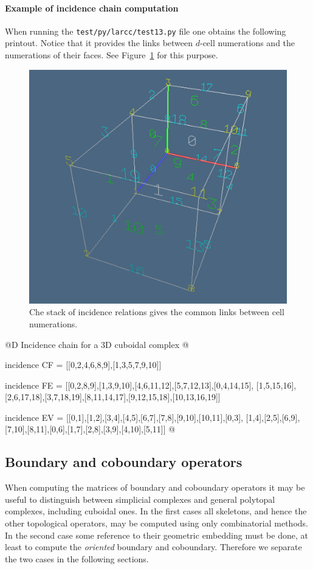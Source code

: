 \documentclass[11pt,oneside]{article}	%
\begin{document}
\paragraph{Example of incidence chain computation}
When running the \texttt{test/py/larcc/test13.py} file one obtains the following printout. 
Notice that 
it provides the links between $d$-cell numerations and the numerations of their faces.
See Figure~\ref{incidenceChain} for this purpose.

\begin{figure}[htbp] %
   \centering
   \includegraphics[width=0.5\linewidth]{images/incidenceChain} 
   \caption{Che stack of incidence relations gives the common links between cell numerations.}
   \label{incidenceChain}
\end{figure}


@D Incidence chain for a 3D cuboidal complex
@{incidence CF = [[0,2,4,6,8,9],[1,3,5,7,9,10]]

incidence FE = [[0,2,8,9],[1,3,9,10],[4,6,11,12],[5,7,12,13],[0,4,14,15],
[1,5,15,16],[2,6,17,18],[3,7,18,19],[8,11,14,17],[9,12,15,18],[10,13,16,19]]

incidence EV = [[0,1],[1,2],[3,4],[4,5],[6,7],[7,8],[9,10],[10,11],[0,3],
[1,4],[2,5],[6,9],[7,10],[8,11],[0,6],[1,7],[2,8],[3,9],[4,10],[5,11]]
@}



\subsection{Boundary and coboundary operators}

When computing the matrices of boundary and coboundary operators it may be useful to distinguish between simplicial complexes and general polytopal complexes, including  cuboidal ones. In the first cases all skeletons, and hence the other topological operators, may be computed using only combinatorial methods. In the second case some reference to their geometric embedding must be done, at least to compute the \emph{oriented} boundary and coboundary. Therefore we separate the two cases in the following sections.
\end{document}
